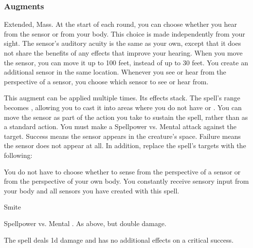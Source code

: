 \subsubsection{Augments}
 Extended, Mass.
At the start of each round, you can choose whether you hear from the sensor or from your body.
This choice is made independently from your sight.
The sensor's auditory acuity is the same as your own, except that it does not share the benefits of any  effects that improve your hearing.
When you move the sensor, you can move it up to 100 feet, instead of up to 30 feet.
You create an additional sensor in the same location.
Whenever you see or hear from the perspective of a sensor, you choose which sensor to see or hear from.
\par
This augment can be applied multiple times.
Its effects stack.
The spell's range becomes \rngunrestricted, allowing you to cast it into areas where you do not have  or .
You can move the sensor as part of the action you take to sustain the spell, rather than as a standard action.
You must make a Spellpower vs. Mental attack against the target.
Success means the sensor appears in the creature's space.
Failure means the sensor does not appear at all.
In addition, replace
the spell's targets with the following:
\begin{augmenttargetinginfo}
\end{augmenttargetinginfo}
You do not have to choose whether to sense from the perspective of a sensor or from the perspective of your own body.
You constantly receive sensory input from your body and all sensors you have created with this spell.
\begin{spellsection}{Smite}
\begin{spellheader}
\end{spellheader}
\begin{spellcontent}
\begin{spelltargetinginfo}
\end{spelltargetinginfo}
\begin{spelleffects}
\begin{spellattack}{Spellpower vs. Mental}
\spellsuccess {}.
\spellcritical As above, but double damage.
\end{spellattack}
\end{spelleffects}
\end{spellcontent}
\begin{spellfooter}
\miscastexplode
\end{spellfooter}
\begin{spellcantrip}
The spell deals \minus1d damage and has no additional effects on a critical success.
\end{spellcantrip}
\end{spellsection}
